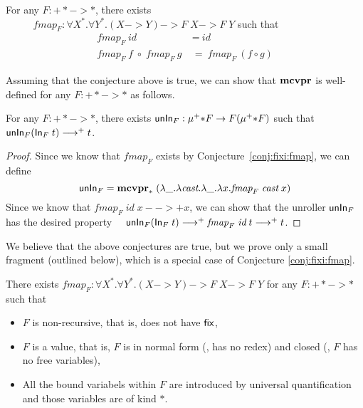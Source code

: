 \begin{conjecture}\label{conj:fixi:fmap}
For any $F : +* -> *$, there exists\\ \vspace*{-1ex}
$\phantom{A}\qquad
        \textit{fmap}_F : \forall X^{*}.\forall Y^{*}.(X -> Y) -> F\;X -> F\;Y$
\quad such that
\begin{align*}
\textit{fmap}_F~\textit{id} &~=~ \textit{id} \\
\textit{fmap}_F~\textit{f} \;\circ\; \textit{fmap}_F~\textit{g}
&~=~ \textit{fmap}_F~(f\circ g)
\end{align*}
\end{conjecture}
\noindent
Assuming that the conjecture above is true,
we can show that $\mathbf{mcvpr}$ is well-defined for any $F: +* -> *$ as follows.
\begin{conjecture} For any $F : +* -> *$, there exists
$\mathsf{unIn}_F : \mu^{+}{*} F -> F(\mu^{+}{*} F)$ such that
$\mathsf{unIn}_F (\mathsf{In}_F\;t) -->+ t$.
\end{conjecture}
\begin{proof}
Since we know that $\textit{fmap}_F$ exists by Conjecture~\ref{conj:fixi:fmap},
we can define
\[ \mathsf{unIn}_F = \mathbf{mcvpr}_{*}\;
            (\lambda\_.\lambda\textit{cast}.\lambda\_.\lambda x.\textit{fmap}_F\;\textit{cast}\;x)
\]
Since we know that $\textit{fmap}_F\;\textit{id}\;x -->+ x$,
we can show that the unroller $\mathsf{unIn}_F$ has the desired property
$\quad \mathsf{unIn}_F (\mathsf{In}_F\;t) -->+ \textit{fmap}_F\;\textit{id}\;t -->+ t $.
\end{proof}
We believe that the above conjectures are true, but we prove only
a small fragment (outlined below), which is a special case
of Conjecture \ref{conj:fixi:fmap}.
\begin{proposition}\label{prop:fixi:fmapBaseCase}
There exists
$\textit{fmap}_F : \forall X^{*}.\forall Y^{*}.(X -> Y) -> F\;X -> F\;Y$
for any $F : +* -> *$ such that
\begin{itemize}
        \item $F$ is non-recursive, that is, does not have $\mathsf{fix}$,
        \item $F$ is a value, that is, $F$ is
                in normal form (\ie, has no redex) and
                closed (\ie, $F$ has no free variables),
        \item All the bound variabels within $F$ are
                introduced by universal quantification
                and those variables are of kind $*$.
\end{itemize}
\end{proposition}
